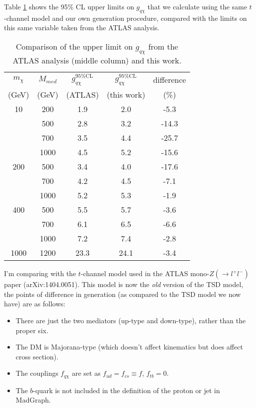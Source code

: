 \begin{flushleft}
Table \ref{tab:monoZvalidation} shows the 95\% CL upper limits on $g_{q \chi}$ that we calculate using the same $t$-channel model and our own generation procedure, compared with the limits on this same variable taken from the ATLAS analysis.

\begin{table}
\begin{center}
\begin{tabular}{| c | c | c | c | c |}
\hline
$m_{\chi}$ & $M_{med}$ & $g_{q \chi}^{95\%\mathrm{CL}}$ & $g_{q \chi}^{95\%\mathrm{CL}}$ & difference \T \\
(GeV) & (GeV) & (ATLAS) & (this work) & (\%) \B \\
\hline
\hline
10 & 200 & 1.9 & 2.0 & -5.3 \T \\
 & 500 & 2.8 & 3.2 & -14.3 \\
 & 700 & 3.5 & 4.4 & -25.7 \\
 & 1000 & 4.5 & 5.2 & -15.6 \\
200 & 500 & 3.4 & 4.0 & -17.6 \T \\
 & 700 & 4.2 & 4.5 & -7.1 \\
 & 1000 & 5.2 & 5.3 & -1.9 \\
400 & 500 & 5.5 & 5.7 & -3.6 \T \\
 & 700 & 6.1 & 6.5 & -6.6 \\
 & 1000 & 7.2 & 7.4 & -2.8 \\
1000 & 1200 & 23.3 & 24.1 & -3.4 \T \B \\
\hline
\end{tabular}
\end{center}
\label{tab:monoZvalidation}
\caption{Comparison of the upper limit on $g_{q \chi}$ from the ATLAS analysis (middle column) and this work.}
\end{table} 

I'm comparing with the $t$-channel model used in the ATLAS mono-$Z (\rightarrow l^+ l^-)$ paper (arXiv:1404.0051). This model is now the \emph{old} version of the TSD model, the points of difference in generation (as compared to the TSD model we now have) are as follows:

\iffalse

\begin{itemize}
\item There are just the two mediators (up-type and down-type), rather than the proper six.
\item The DM is Majorana-type (which doesn't affect kinematics but does affect cross section).
\item The couplings $f_{q \chi}$ are set as $f_{ud} = f_{cs} \equiv f$, $f_{tb} = 0$.
\item The $b$-quark is not included in the definition of the proton or jet in MadGraph.
\end{itemize}


\end{flushleft}
